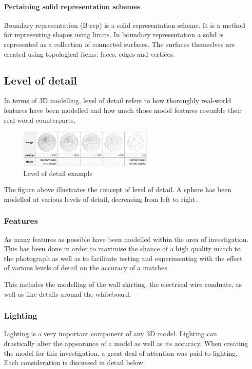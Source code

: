 \documentclass[11pt,a4paper]{report}
\begin{document}
				\paragraph{Pertaining solid representation schemes}
					Boundary representation (B-rep) is a solid representation scheme. It is a method for representing shapes using limits. In boundary representation a solid is represented as a collection of connected surfaces. The surfaces themselves are created using topological items: faces, edges and vertices.
					\cite{hongxin_zhang_introduction_2007}
				
		\subsection{Level of detail}
			In terms of 3D modelling, level of detail refers to how thoroughly real-world features have been modelled and how much those model features resemble their real-world counterparts.
			
			\begin{figure}[h!]
				\centering
				\includegraphics[width=0.6\textwidth]{level_of_detail_example}
				\caption{Level of detail example}
			\end{figure}
			
			The figure above illustrates the concept of level of detail. A sphere has been modelled at various levels of detail, decreasing from left to right.
			
			\subsubsection{Features}
				As many features as possible have been modelled within the area of investigation. This has been done in order to maximise the chance of a high quality match to the photograph as well as to facilitate testing and experimenting with the effect of various levels of detail on the accuracy of a matches. 
				
				This includes the modelling of the wall skirting, the electrical wire conduate, as well as fine details around the whiteboard. 
				
			\subsubsection{Lighting}
				Lighting is a very important component of any 3D model. Lighting can drastically alter the appearance of a model as well as its accuracy. When creating the model for this investigation, a great deal of attention was paid to lighting. Each consideration is discussed in detail below.
				
\end{document}
